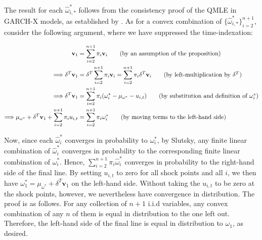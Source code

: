 \documentclass{uiucthesis2021}
\newcommand{\weight}{\pi}
\newcommand{\x}{\textbf{v}}
\theoremstyle{definition}
\newenvironment{proof-of-proposition}[1][{}]{\noindent{\bf
    Proof of Proposition {#1}}
  \hspace*{.5em}}{\qed\bigskip\\}
\begin{document}
    \begin{proof-of-proposition}[\ref{adjustment}]
    The result for each $\hat\omega^{*}_{i,*}$ follows from the consistency proof of the QMLE in GARCH-X models, as established by \cite[][]{han2014asymptotic}.  As for a convex combination of $\{\hat\omega^{*}_{i,*}\}_{i=2}^{n+1}$, consider the following argument, where we have suppressed the time-indexation:

    \begin{align}
    \x_{1} &= \sum^{n+1}_{i=2}\weight_{i}\x_{i} \tag{by an assumption of the proposition}\\
   \Longrightarrow \delta^{T}\x_{1} &= \delta^{T}\sum^{n+1}_{i=2}\weight_{i}\x_{i}  = \sum^{n+1}_{i=2}\weight_{i}\delta^{T}\x_{i}\tag{by left-multiplication by $\delta^{T}$}\\
    \Longrightarrow\delta^{T}\x_{1} &=\sum^{n+1}_{i=2}\pi_{i}(\omega_{i}^{*} - \mu_{\omega^{*}} - u_{i,t})\tag{by substitution and definition of $\omega^{*}_{i}$}\\
    \Longrightarrow\mu_{\omega^{*}} + \delta^{T}\x_{1} + \sum^{n+1}_{i=2}\pi_{i}u_{i,t} &= \sum^{n+1}_{i=2}\pi_{i}\omega_{i}^{*} \tag{by moving  terms to the left-hand side}
    \end{align}

Now, since each $\hat\omega^{*}_{i}$ converges in probability to $\omega^{*}_{i}$, by Slutsky, any finite linear combination of $\hat\omega^{*}_{i}$ converges in probability to the corresponding finite linear combination of $\omega^{*}_{i}$.  Hence, $\sum^{n+1}_{i=2}\pi_{i}\hat\omega_{i}^{*}$ converges in probability to the right-hand side of the final line.  By setting $u_{i,t}$ to zero for all shock points and all $i$, we then have $\omega_{1}^{*} = \mu_{\omega^{*}} + \delta^{T}\x_{1} $ on the left-hand side.  Without taking the $u_{i,t}$ to be zero at the shock points, however, we nevertheless have convergence in distribution.  The proof is as follows.  For any collection of $n+1$ i.i.d variables, any convex combination of any $n$ of them is equal in distribution to the one left out.  Therefore, the left-hand side of the final line is equal in distribution to $\omega_{1}$, as desired.
    \end{proof-of-proposition}
\end{document}
